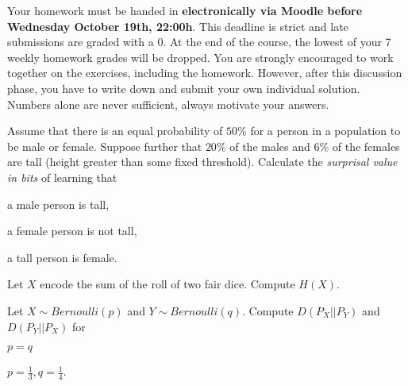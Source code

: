 \documentclass[a4paper,10pt,landscape,twocolumn]{scrartcl}
\newcommand\deadline{Wednesday October 19th, 22:00h}
\begin{document}
\homeworkproblems

{\sffamily\noindent
Your homework must be handed in \textbf{electronically via Moodle before \deadline}.  This deadline is strict and late submissions are graded with a 0. At the end of the course, the lowest of your 7 weekly homework grades will be dropped. You are strongly encouraged to work together on the exercises, including the homework. However, after this discussion phase, you have to write down and submit your own individual solution. Numbers alone are never sufficient, always motivate your answers.
}

\begin{exercise}
Assume that there is an equal probability of $50\%$ for a person in a population to be male or female. Suppose further that $20\%$ of the males and $6\%$ of the females are tall (height greater than some fixed threshold). Calculate the \emph{surprisal value in bits} of learning that

\begin{subex}
a male person is tall, 
\end{subex}

\begin{subex}
a female person is not tall, 
\end{subex}

\begin{subex}
a tall person is female.
\end{subex}

\end{exercise}

\begin{exercise}
Let $X$ encode the sum of the roll of two fair dice. Compute $H(X)$.
\end{exercise}

\begin{exercise}
Let $X \sim Bernoulli(p)$ and $Y \sim Bernoulli(q)$. Compute $D(P_X || P_Y)$ and $D(P_Y || P_X)$ for 

\begin{subex}
$p=q$
\end{subex}

\begin{subex}
$p=\frac 1 3, q=\frac 1 4$.
\end{subex}

\end{exercise}
\end{document}
